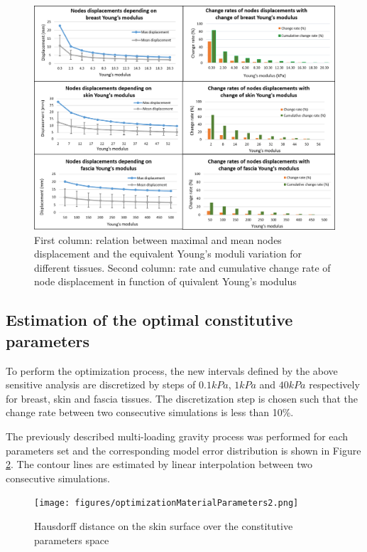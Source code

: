 \begin{figure}[!h]
\centering
\includegraphics[width=\textwidth,keepaspectratio]{figures/materialPropDiscretization.png} 
\caption{First column: relation between maximal and mean nodes displacement and the equivalent Young's moduli variation for different tissues. Second column: rate and cumulative change rate of node displacement in function of quivalent Young's modulus}\label{fig:materialPropDiscretization}
\end{figure}

\subsection{Estimation of the optimal constitutive parameters}
To perform the optimization process, the new intervals defined by the above sensitive analysis are discretized by steps of $0.1 kPa$, $1kPa$ and $40 kPa$ respectively for breast, skin and fascia tissues. The discretization step is chosen such that the change rate between two consecutive simulations is less than 10\%.

The previously described multi-loading gravity process was performed for each parameters set and the corresponding model error distribution is shown in  Figure \ref{fig:optimizationresults}. The contour lines are estimated by linear interpolation between two consecutive simulations.

\begin{figure}[!h]
\centering
\texttt{[image: figures/optimizationMaterialParameters2.png]} 
\caption{Hausdorff distance on the skin surface over the constitutive parameters space}\label{fig:optimizationresults}
\end{figure}

